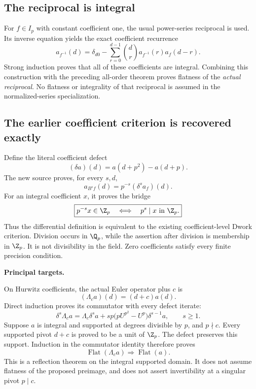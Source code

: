 \subsection*{The reciprocal is integral}
For $f\in I_p$ with constant coefficient one, the usual power-series reciprocal is used. Its inverse equation yields the exact coefficient recurrence
\[
 a_{f^{-1}}(d)=\delta_{d0}-\sum_{r=0}^{d-1}
     \binom dr a_{f^{-1}}(r)a_f(d-r).
\]
Strong induction proves that all of these coefficients are integral. Combining this construction with the preceding all-order theorem proves flatness of the \emph{actual reciprocal}. No flatness or integrality of that reciprocal is assumed in the normalized-series specialization.

\subsection*{The earlier coefficient criterion is recovered exactly}
Define the literal coefficient defect
\[
 (\delta a)(d)=a(d+p^2)-a(d+p).
\]
The new source proves, for every $s,d$,
\[
 a_{B^s f}(d)=p^{-s}(\delta^s a_f)(d).
\]
For an integral coefficient $x$, it proves the bridge
\[
\boxed{p^{-s}x\in\Z_p\quad\Longleftrightarrow\quad p^s\mid x\text{ in }\Z_p.}
\]
Thus the differential definition is equivalent to the existing coefficient-level Dwork criterion. Division occurs in $\Q_p$, while the assertion after division is membership in $\Z_p$. It is not divisibility in the field. Zero coefficients satisfy every finite precision condition.

\textbf{Principal targets.}\par
{}\par
{}\par
{}\par
{}

\par\medskip
{}
On Hurwitz coefficients, the actual Euler operator plus $c$ is
\[
 (\Lambda_c a)(d)=(d+c)a(d).
\]
Direct induction proves its commutator with every defect iterate:
\[
 \delta^s\Lambda_c a
 =\Lambda_c\delta^s a
  +sp\bigl(pU^{p^2}-U^p\bigr)\delta^{s-1}a,
 \qquad s\ge1.
\]
Suppose $a$ is integral and supported at degrees divisible by $p$, and $p\nmid c$. Every supported pivot $d+c$ is proved to be a unit of $\Z_p$. The defect preserves this support. Induction in the commutator identity therefore proves
\[
 \operatorname{Flat}(\Lambda_c a)\Longrightarrow\operatorname{Flat}(a).
\]
This is a reflection theorem on the integral supported domain. It does not assume flatness of the proposed preimage, and does not assert invertibility at a singular pivot $p\mid c$.

